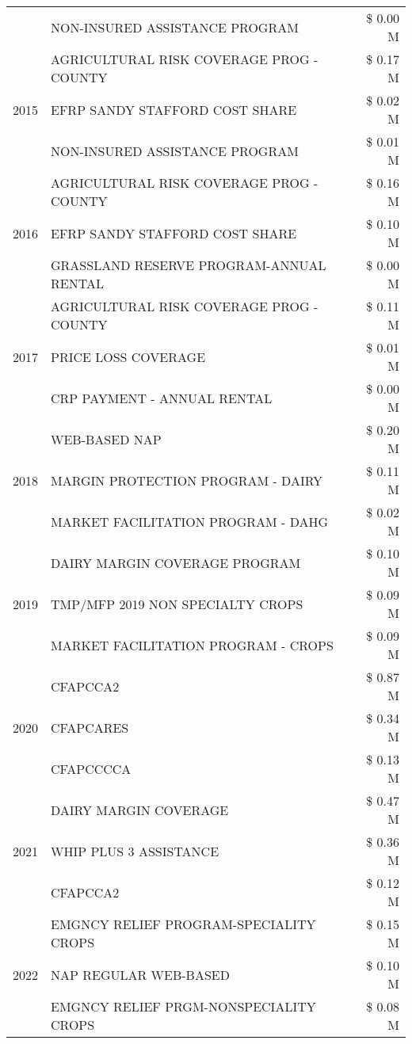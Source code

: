 \begin{tabular}{llr}
 & NON-INSURED ASSISTANCE PROGRAM & \$ 0.00 M \\
\cline{1-3}
\multirow[t]{3}{*}{2015} & AGRICULTURAL RISK COVERAGE PROG - COUNTY & \$ 0.17 M \\
 & EFRP SANDY STAFFORD COST SHARE & \$ 0.02 M \\
 & NON-INSURED ASSISTANCE PROGRAM & \$ 0.01 M \\
\cline{1-3}
\multirow[t]{3}{*}{2016} & AGRICULTURAL RISK COVERAGE PROG - COUNTY & \$ 0.16 M \\
 & EFRP SANDY STAFFORD COST SHARE & \$ 0.10 M \\
 & GRASSLAND RESERVE PROGRAM-ANNUAL RENTAL & \$ 0.00 M \\
\cline{1-3}
\multirow[t]{3}{*}{2017} & AGRICULTURAL RISK COVERAGE PROG - COUNTY & \$ 0.11 M \\
 & PRICE LOSS COVERAGE & \$ 0.01 M \\
 & CRP PAYMENT - ANNUAL RENTAL & \$ 0.00 M \\
\cline{1-3}
\multirow[t]{3}{*}{2018} & WEB-BASED NAP & \$ 0.20 M \\
 & MARGIN PROTECTION PROGRAM - DAIRY & \$ 0.11 M \\
 & MARKET FACILITATION PROGRAM - DAHG & \$ 0.02 M \\
\cline{1-3}
\multirow[t]{3}{*}{2019} & DAIRY MARGIN COVERAGE PROGRAM & \$ 0.10 M \\
 & TMP/MFP 2019 NON SPECIALTY CROPS & \$ 0.09 M \\
 & MARKET FACILITATION PROGRAM - CROPS & \$ 0.09 M \\
\cline{1-3}
\multirow[t]{3}{*}{2020} & CFAPCCA2 & \$ 0.87 M \\
 & CFAPCARES & \$ 0.34 M \\
 & CFAPCCCCA & \$ 0.13 M \\
\cline{1-3}
\multirow[t]{3}{*}{2021} & DAIRY MARGIN COVERAGE & \$ 0.47 M \\
 & WHIP PLUS 3 ASSISTANCE & \$ 0.36 M \\
 & CFAPCCA2 & \$ 0.12 M \\
\cline{1-3}
\multirow[t]{3}{*}{2022} & EMGNCY RELIEF PROGRAM-SPECIALITY CROPS & \$ 0.15 M \\
 & NAP REGULAR WEB-BASED & \$ 0.10 M \\
 & EMGNCY RELIEF PRGM-NONSPECIALITY CROPS & \$ 0.08 M \\
\cline{1-3}
\bottomrule
\end{tabular}

